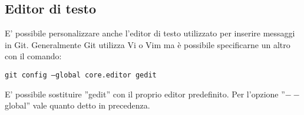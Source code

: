 \subsection{Editor di testo}
E' possibile personalizzare anche l'editor di testo utilizzato per inserire messaggi in Git. Generalmente Git utilizza Vi o Vim ma è possibile specificarne un altro con il comando:

\begin{center}
\texttt{git config --global core.editor gedit}
\end{center}

E' possibile sostituire ''gedit'' con il proprio editor predefinito. Per l'opzione ''$--$global'' vale quanto detto in precedenza.